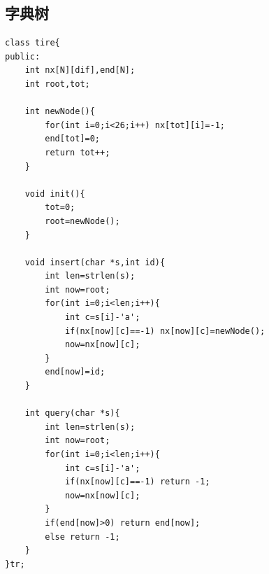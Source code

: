 \documentclass[twoside]{article}
\begin{document}
\subsection{字典树}
\begin{lstlisting}
class tire{
public:
    int nx[N][dif],end[N];
    int root,tot;

    int newNode(){
        for(int i=0;i<26;i++) nx[tot][i]=-1;
        end[tot]=0;
        return tot++;
    }

    void init(){
        tot=0;
        root=newNode();
    }

    void insert(char *s,int id){
        int len=strlen(s);
        int now=root;
        for(int i=0;i<len;i++){
            int c=s[i]-'a';
            if(nx[now][c]==-1) nx[now][c]=newNode();
            now=nx[now][c];
        }
        end[now]=id;
    }

    int query(char *s){
        int len=strlen(s);
        int now=root;
        for(int i=0;i<len;i++){
            int c=s[i]-'a';
            if(nx[now][c]==-1) return -1;
            now=nx[now][c];
        }
        if(end[now]>0) return end[now];
        else return -1;
    }
}tr;\end{lstlisting}
\end{document}
